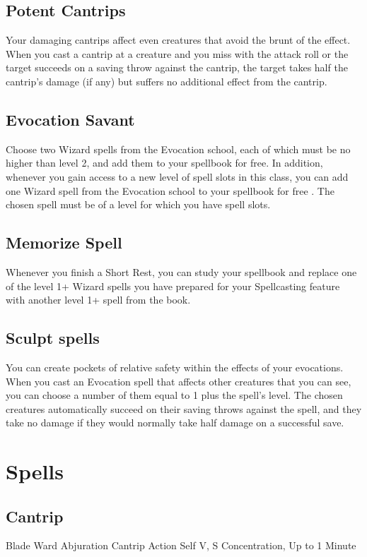\documentclass[letterpaper,openany,oneside,twocolumn]{book}
\begin{document}
\subsection*{Potent Cantrips}
Your damaging cantrips affect even creatures that avoid the brunt of the effect. When you cast a cantrip at a creature and you miss with the attack roll or the target succeeds on a saving throw against the cantrip, the target takes half the cantrip's damage (if any) but suffers no additional effect from the cantrip.
\subsection*{Evocation Savant}
Choose two Wizard spells from the Evocation school, each of which must be no higher than level 2, and add them to your spellbook for free.
In addition, whenever you gain access to a new level of spell slots in this class, you can add one Wizard spell from the Evocation school to your spellbook for free . The chosen spell must be of a level for which you have spell slots.
\subsection*{Memorize Spell}
Whenever you finish a Short Rest, you can study your spellbook and replace one of the level 1+ Wizard spells you have prepared for your Spellcasting feature with another level 1+ spell from the book.
\subsection*{Sculpt spells}
You can create pockets of relative safety within the effects of your evocations.
When you cast an Evocation spell that affects other creatures that you can see, you can choose a number of them equal to 1 plus the spell's level.
The chosen creatures automatically succeed on their saving throws against the spell, and they take no damage if they would normally take half damage on a successful save.
\section*{Spells}
\subsection*{Cantrip}

\DndSpellHeader
  {Blade Ward}
  {Abjuration Cantrip}
  {Action}
  {Self}
  {V, S}
  {Concentration, Up to 1 Minute}
\end{document}
